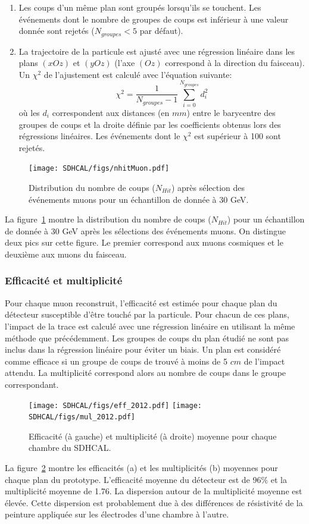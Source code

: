 \begin{enumerate}[-]
\item Les coups d'un même plan sont groupés lorsqu'ils se touchent. Les événements dont le nombre de groupes de coups est inférieur à une valeur donnée sont rejetés ($N_{groupes}<5$ par défaut).
\item La trajectoire de la particule est ajusté avec une régression linéaire dans les plans $(xOz)$ et $(yOz)$ (l'axe $(Oz)$ correspond à la direction du faisceau). Un $\chi^2$ de l'ajustement est calculé  avec l'équation suivante:
  \begin{equation}
    \chi^2=\frac{1}{N_{groupes}-1}\sum_{i=0}^{N_{groupes}}d_i^2
  \end{equation}
où les $d_i$ correspondent aux distances (en $mm$) entre le barycentre des groupes de coups et la droite définie par les coefficients obtenus lors des régressions linéaires. Les événements dont le $\chi^2$ est supérieur à 100 sont rejetés.
\end{enumerate}
\begin{figure}[!h]
  \begin{center}
    \texttt{[image: SDHCAL/figs/nhitMuon.pdf]}
    \caption{Distribution du nombre de coups ($N_{Hit}$) après sélection des événements muons pour un échantillon de donnée à 30 GeV.}
    \label{fig:nhitMuon}
  \end{center}
\end{figure}
La figure~\ref{fig:nhitMuon} montre la distribution du nombre de coups ($N_{Hit}$) pour un échantillon de donnée à 30 GeV après les sélections des événements muons. On distingue deux pics sur cette figure. Le premier correspond aux muons cosmiques et le deuxième aux muons du faisceau.
\subsubsection{Efficacité et multiplicité}
Pour chaque muon reconstruit, l'efficacité est estimée pour chaque plan du détecteur susceptible d'être touché par la particule. Pour chacun de ces plans, l'impact de la trace est calculé avec une régression linéaire en utilisant la même méthode que précédemment. Les groupes de coups du plan étudié ne sont pas inclus dans la régression linéaire pour éviter un biais. Un plan est considéré comme efficace si un groupe de coups de trouvé à moins de 5 $cm$ de l'impact attendu. La multiplicité correspond alors au nombre de coups dans le groupe correspondant. 
\begin{figure}[!h]
  \begin{center}
    \texttt{[image: SDHCAL/figs/eff\_2012.pdf]}
    \texttt{[image: SDHCAL/figs/mul\_2012.pdf]}
    \caption{Efficacité (à gauche) et multiplicité (à droite) moyenne pour chaque chambre du SDHCAL.}
    \label{fig:eff_and_multi}
  \end{center}
\end{figure}
La figure~\ref{fig:eff_and_multi} montre les efficacités (a) et les multiplicités (b) moyennes pour chaque plan du prototype. L'efficacité moyenne du détecteur est de 96$\%$ et la multiplicité moyenne de 1.76. La dispersion autour de la multiplicité moyenne est élevée. Cette dispersion est probablement due à des différences de résistivité de la peinture appliquée sur les électrodes d'une chambre à l'autre.
